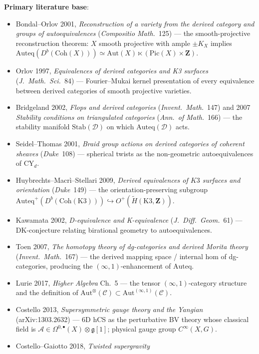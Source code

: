 \documentclass[11pt]{amsart}
\theoremstyle{definition}
\providecommand{\Coh}{\mathrm{Coh}}
\providecommand{\Aut}{\mathrm{Aut}}
\providecommand{\Auteq}{\mathrm{Auteq}}
\providecommand{\AutInf}{\mathrm{Aut}^{(\infty,1)}}
\providecommand{\AutMon}{\mathrm{Aut}^{\otimes}}
\providecommand{\Stab}{\mathrm{Stab}}
\providecommand{\Pic}{\mathrm{Pic}}
\providecommand{\fg}{\mathfrak{g}}
\providecommand{\cA}{\mathcal{A}}
\providecommand{\cC}{\mathcal{C}}
\providecommand{\cD}{\mathcal{D}}
\providecommand{\bZ}{\mathbf{Z}}
\begin{document}
\noindent\textbf{Primary literature base}:
\begin{itemize}\itemsep 2pt
 \item Bondal--Orlov 2001, \emph{Reconstruction of a variety from
   the derived category and groups of autoequivalences}
   (\emph{Compositio Math.}~125) --- the smooth-projective
   reconstruction theorem: $X$ smooth projective with ample
   $\pm K_X$ implies
   $\Auteq(D^b(\Coh(X))) \simeq \Aut(X) \ltimes (\Pic(X) \times \bZ)$.
 \item Orlov 1997, \emph{Equivalences of derived categories and K3
   surfaces} (\emph{J.\ Math.\ Sci.}~84) --- Fourier--Mukai kernel
   presentation of every equivalence between derived categories of
   smooth projective varieties.
 \item Bridgeland 2002, \emph{Flops and derived categories}
   (\emph{Invent.\ Math.}~147) and 2007
   \emph{Stability conditions on triangulated categories}
   (\emph{Ann.\ of Math.}~166) --- the stability manifold
   $\Stab(\cD)$ on which $\Auteq(\cD)$ acts.
 \item Seidel--Thomas 2001, \emph{Braid group actions on derived
   categories of coherent sheaves} (\emph{Duke}~108) --- spherical
   twists as the non-geometric autoequivalences of CY$_d$.
 \item Huybrechts--Macr\`i--Stellari 2009, \emph{Derived equivalences
   of $K3$ surfaces and orientation} (\emph{Duke}~149) --- the
   orientation-preserving subgroup $\Auteq^+(D^b(\Coh(\mathrm{K3})))
   \hookrightarrow O^+(\widetilde{H}(\mathrm{K3}, \bZ))$.
 \item Kawamata 2002, \emph{D-equivalence and K-equivalence}
   (\emph{J.\ Diff.\ Geom.}~61) --- DK-conjecture relating birational
   geometry to autoequivalences.
 \item Toen 2007, \emph{The homotopy theory of dg-categories and
   derived Morita theory} (\emph{Invent.\ Math.}~167) --- the derived
   mapping space / internal hom of dg-categories, producing the
   $(\infty,1)$-enhancement of $\Auteq$.
 \item Lurie 2017, \emph{Higher Algebra} Ch.~5 --- the tensor
   $(\infty,1)$-category structure and the definition of
   $\AutMon(\cC) \subset \AutInf(\cC)$.
 \item Costello 2013, \emph{Supersymmetric gauge theory and the
   Yangian} (arXiv:1303.2632) --- 6D hCS as the perturbative BV
   theory whose classical field is $\cA \in \Omega^{0,\bullet}(X) \otimes
   \fg[1]$; physical gauge group $C^\infty(X, G)$.
 \item Costello--Gaiotto 2018, \emph{Twisted supergravity}

\end{itemize}
\end{document}
